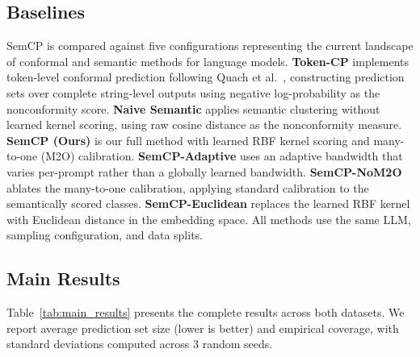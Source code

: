 \documentclass{article}
\begin{document}
\subsection{Baselines}

\label{sec:baselines}

SemCP is compared against five configurations representing the current landscape of conformal and semantic methods for language models. \textbf{Token-CP} implements token-level conformal prediction following Quach et al.\ \cite{quach2023conformal}, constructing prediction sets over complete string-level outputs using negative log-probability as the nonconformity score. \textbf{Naive Semantic} applies semantic clustering without learned kernel scoring, using raw cosine distance as the nonconformity measure. \textbf{SemCP (Ours)} is our full method with learned RBF kernel scoring and many-to-one (M2O) calibration. \textbf{SemCP-Adaptive} uses an adaptive bandwidth that varies per-prompt rather than a globally learned bandwidth. \textbf{SemCP-NoM2O} ablates the many-to-one calibration, applying standard calibration to the semantically scored classes. \textbf{SemCP-Euclidean} replaces the learned RBF kernel with Euclidean distance in the embedding space. All methods use the same LLM, sampling configuration, and data splits.

\subsection{Main Results}

\label{sec:main_results}

Table~\ref{tab:main_results} presents the complete results across both datasets. We report average prediction set size (lower is better) and empirical coverage, with standard deviations computed across 3 random seeds.
\end{document}
